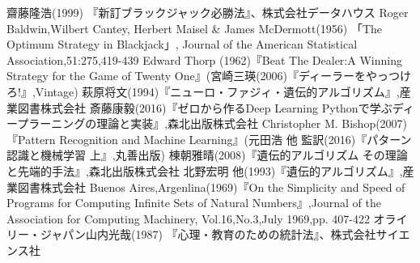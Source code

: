 \begin{thebibliography}{9}
   齋藤隆浩(1999) 『新訂ブラックジャック必勝法』、株式会社データハウス
   Roger Baldwin,Wilbert Cantey, Herbert Maisel \& James McDermott(1956) 「The Optimum Strategy in Blackjack」, Journal of the American Statistical Association,51:275,419-439
  Edward Thorp (1962)『Beat The Dealer:A Winning Strategy for the Game of Twenty One』(宮崎三瑛(2006)『ディーラーをやっつけろ!』,Vintage)
   萩原将文(1994)『ニューロ・ファジィ・遺伝的アルゴリズム』,産業図書株式会社
   斎藤康毅(2016)『ゼロから作るDeep Learning Pythonで学ぶディープラーニングの理論と実装』,森北出版株式会社
   Christopher M. Bishop(2007)『Pattern Recognition and Machine Learning』(元田浩 他 監訳(2016)『パターン認識と機械学習 上』,丸善出版)
   棟朝雅晴(2008)『遺伝的アルゴリズム その理論と先端的手法』,森北出版株式会社
   北野宏明 他(1993)『遺伝的アルゴリズム』,産業図書株式会社
   Buenos Aires,Argenlina(1969)『On the Simplicity and Speed of Programs for Computing Infinite Sets of Natural Numbers』,Journal of the Association for Computing Machinery, Vol.16,No.3,July 1969,pp. 407-422
   オライリー・ジャパン山内光哉(1987) 『心理・教育のための統計法』、株式会社サイエンス社
\end{thebibliography}
